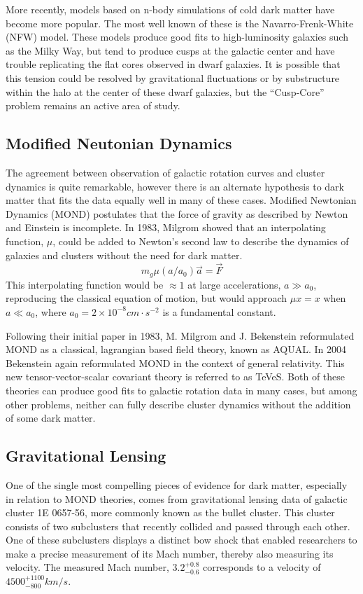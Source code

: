 More recently, models based on n-body simulations of cold dark matter have become more popular. The most well known of these is the Navarro-Frenk-White (NFW) model. These models produce good fits to high-luminosity galaxies such as the Milky Way, but tend to produce cusps at the galactic center and have trouble replicating the flat cores observed in dwarf galaxies. It is possible that this tension could be resolved by gravitational fluctuations or by substructure within the halo at the center of these dwarf galaxies, but the ``Cusp-Core'' problem remains an active area of study\cite{weber, navarro}.




\subsection{Modified Neutonian Dynamics}

The agreement between observation of galactic rotation curves and cluster dynamics is quite remarkable, however there is an alternate hypothesis to dark matter that fits the data equally well in many of these cases. Modified Newtonian Dynamics (MOND) postulates that the force of gravity as described by Newton and Einstein is incomplete. In 1983, Milgrom showed that an interpolating function, $\mu$, could be added to Newton's second law to describe the dynamics of galaxies and clusters without the need for dark matter.
\begin{equation}\label{eq:interp_func}
m_{g}\mu(a/a_{0})\vec{a}=\vec{F}
\end{equation}
This interpolating function would be $\approx 1$ at large accelerations, $a\gg a_{0}$, reproducing the classical equation of motion, but would approach $\mu{x}=x$ when $a\ll a_{0}$, where $a_{0}=2 \times 10^{-8} cm\cdot s^{-2}$ is a fundamental constant\cite{milgrom, bekenstein}. 

Following their initial paper in 1983, M. Milgrom and J. Bekenstein reformulated MOND as a classical, lagrangian based field theory, known as AQUAL. In 2004 Bekenstein again reformulated MOND in the context of general relativity. This new tensor-vector-scalar covariant theory is referred to as TeVeS\cite{bekenstein}. Both of these theories can produce good fits to galactic rotation data in many cases, but among other problems, neither can fully describe cluster dynamics without the addition of some dark matter\cite{bekenstein, chaichiana}.

\subsection{Gravitational Lensing}
One of the single most compelling pieces of evidence for dark matter, especially in relation to MOND theories, comes from gravitational lensing data of galactic cluster 1E 0657-56, more commonly known as the bullet cluster. This cluster consists of two subclusters that recently collided and passed through each other. One of these subclusters displays a distinct bow shock that enabled researchers to make a precise measurement of its Mach number, thereby also measuring its velocity. The measured Mach number, $3.2_{-0.6}^{+0.8}$ corresponds to a velocity of $4500_{-800}^{+1100}km/s$\cite{markevitch}. 


